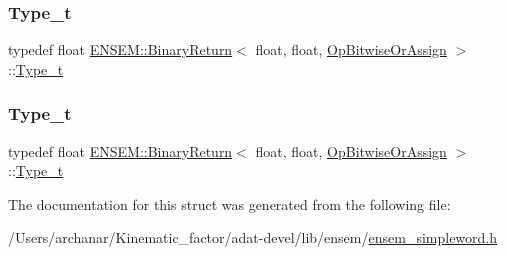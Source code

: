 \mbox{\label{structENSEM_1_1BinaryReturn_3_01float_00_01float_00_01OpBitwiseOrAssign_01_4_a3e0892dc0a6beaa65d6fbf03b5fe3250}} 
\subsubsection{\texorpdfstring{Type\_t}{Type\_t}\hspace{0.1cm}{\footnotesize\ttfamily [2/3]}}
{\footnotesize\ttfamily typedef float \mbox{\hyperlink{structENSEM_1_1BinaryReturn}{E\+N\+S\+E\+M\+::\+Binary\+Return}}$<$ float, float, \mbox{\hyperlink{structENSEM_1_1OpBitwiseOrAssign}{Op\+Bitwise\+Or\+Assign}} $>$\+::\mbox{\hyperlink{structENSEM_1_1BinaryReturn_3_01float_00_01float_00_01OpBitwiseOrAssign_01_4_a3e0892dc0a6beaa65d6fbf03b5fe3250}{Type\+\_\+t}}}

\mbox{\label{structENSEM_1_1BinaryReturn_3_01float_00_01float_00_01OpBitwiseOrAssign_01_4_a3e0892dc0a6beaa65d6fbf03b5fe3250}} 
\subsubsection{\texorpdfstring{Type\_t}{Type\_t}\hspace{0.1cm}{\footnotesize\ttfamily [3/3]}}
{\footnotesize\ttfamily typedef float \mbox{\hyperlink{structENSEM_1_1BinaryReturn}{E\+N\+S\+E\+M\+::\+Binary\+Return}}$<$ float, float, \mbox{\hyperlink{structENSEM_1_1OpBitwiseOrAssign}{Op\+Bitwise\+Or\+Assign}} $>$\+::\mbox{\hyperlink{structENSEM_1_1BinaryReturn_3_01float_00_01float_00_01OpBitwiseOrAssign_01_4_a3e0892dc0a6beaa65d6fbf03b5fe3250}{Type\+\_\+t}}}



The documentation for this struct was generated from the following file\+:\begin{DoxyCompactItemize}
\item 
/\+Users/archanar/\+Kinematic\+\_\+factor/adat-\/devel/lib/ensem/\mbox{\hyperlink{adat-devel_2lib_2ensem_2ensem__simpleword_8h}{ensem\+\_\+simpleword.\+h}}\end{DoxyCompactItemize}
